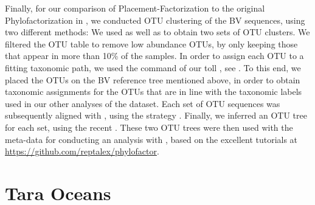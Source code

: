 Finally, for our comparison of Placement-Factorization to the original Phylofactorization \cite{Washburne2017a}
in ,
we conducted OTU clustering of the \ac{BV} sequences, using two different methods:
We used  \cite{Rognes2016} as well as  \cite{Mahe2014,Mahe2015}
to obtain two sets of OTU clusters.
We filtered the OTU table to remove low abundance OTUs, by only keeping those that appear in more than 10\% of the samples.
In order to assign each OTU to a fitting taxonomic path,
we used the  command of our toll  \cite{Czech2019-genesis-gappa},
see .
To this end, we placed the OTUs on the BV reference tree mentioned above,
in order to obtain taxonomic assignments for the OTUs
that are in line with the taxonomic labels used in our other analyses of the dataset.
Each set of OTU sequences was subsequently aligned with  \cite{Katoh2002,Katoh2013},
using the  strategy \cite{Katoh2005}.
Finally, we inferred an OTU tree for each set, using the recent  \cite{Kozlov2018a}.
These two OTU trees were then used with the meta-data for conducting an analysis with  \cite{Washburne2017a},
based on the excellent tutorials at \url{https://github.com/reptalex/phylofactor}.


%


\section{Tara Oceans}
\label{supp:sec:DetailsEmpiricalDatasets:sub:Tara}

